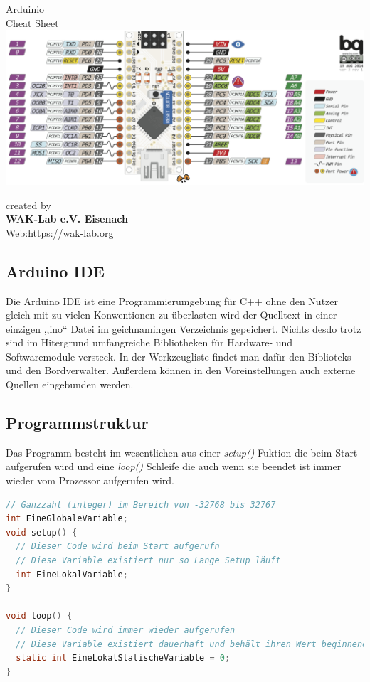  



\begin{center}
	{\Large Arduinio} \\[.3cm]
	{\huge {Cheat Sheet}}\\ [.3cm]
	
	\includegraphics[width=\linewidth]{pictures/nanoFull.png}\\
	\label{fig:Pinout}

	
	\vfill
	created by\\ 
	\textbf{WAK-Lab e.V. Eisenach}\\
	Web:\url{https://wak-lab.org}
\end{center}


\thispagestyle{empty} 
\newpage
\subsection{\large{Arduino IDE}}
Die Arduino IDE ist eine Programmierumgebung für C++ ohne den Nutzer gleich mit zu vielen Konwentionen zu überlasten wird der Quelltext in einer einzigen ,,ino`` Datei im geichnamingen Verzeichnis gepeichert. Nichts desdo trotz sind im Hitergrund umfangreiche Bibliotheken für Hardware- und Softwaremodule versteck. In der Werkzeugliste findet man dafür den Biblioteks und den Bordverwalter. Außerdem können in den Voreinstellungen auch externe Quellen eingebunden werden.\\
\subsection{\large{Programmstruktur}}
Das Programm besteht im wesentlichen aus einer \textit{setup()} Fuktion die beim Start aufgerufen wird und eine \textit{loop()} Schleife die auch wenn sie beendet ist immer wieder vom Prozessor aufgerufen wird.\\
\begin{lstlisting}[language=c, caption=Beispiel]
// Ganzzahl (integer) im Bereich von -32768 bis 32767 
int EineGlobaleVariable; 
void setup() {
  // Dieser Code wird beim Start aufgerufn
  // Diese Variable existiert nur so Lange Setup läuft
  int EineLokalVariable;  
}

void loop() {
  // Dieser Code wird immer wieder aufgerufen
  // Diese Variable existiert dauerhaft und behält ihren Wert beginnend mit 0
  static int EineLokalStatischeVariable = 0; 
}
\end{lstlisting}
\newpage
